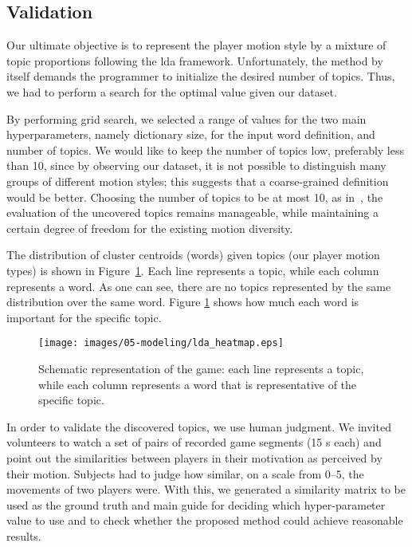{\subsection{Validation}

Our ultimate objective is to represent the player motion style by a mixture of topic proportions following the \gls{lda} framework. Unfortunately, the method by itself demands the programmer to initialize the desired number of topics. Thus, we had to perform a search for the optimal value given our dataset.

By performing grid search, we selected a range of values for the two main hyperparameters, namely dictionary size, for the input word definition, and number of topics. We would like to keep the number of topics low, preferably less than 10, since by observing our dataset, it is not possible to distinguish many groups of different motion styles; this suggests that a coarse-grained definition would be better. Choosing the number of topics to be at most 10, as in~\cite{smith_mining_2016}, the evaluation of the uncovered topics remains manageable, while maintaining a certain degree of freedom for the existing motion diversity.

The distribution of cluster centroids (words) given topics (our player motion types) is shown in Figure~\ref{overallgame}.
Each line represents a topic, while each column represents a word. As one can see, there are no topics represented by the same distribution over the same word. Figure \ref{overallgame} shows how much each word is important for the specific topic.

\begin{figure}[H]
	\centering
	\texttt{[image: images/05-modeling/lda\_heatmap.eps]}
	\caption{Schematic representation of the game: each line represents a topic, while each column represents a word that is representative of the specific topic.}
  \label{overallgame}
\end{figure}

In order to validate the discovered topics, we use human judgment. We invited volunteers to watch a set of pairs of recorded game segments (15 s each) and point out the similarities between players in their motivation as perceived by their motion. Subjects had to judge how similar, on a scale from 0--5, the movements of two players were. With this, we generated a similarity matrix to be used as the ground truth and main guide for deciding which hyper-parameter value to use and to check whether the proposed method could achieve reasonable results.

}
